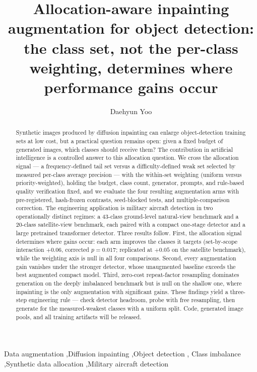 \documentclass[preprint,12pt,authoryear]{elsarticle}
\begin{document}
\begin{frontmatter}

\title{Allocation-aware inpainting augmentation for object detection:
the class set, not the per-class weighting, determines where
performance gains occur}

\author[a]{Daehyun Yoo}

\begin{abstract}
Synthetic images produced by diffusion inpainting can enlarge
object-detection training sets at low cost, but a practical question
remains open: given a fixed budget of generated images, which classes
should receive them? The contribution in artificial intelligence is a
controlled answer to this allocation question. We cross the allocation
signal --- a frequency-defined tail set versus a difficulty-defined weak
set selected by measured per-class average precision --- with the
within-set weighting (uniform versus priority-weighted), holding the
budget, class count, generator, prompts, and rule-based quality
verification fixed, and we evaluate the four resulting augmentation arms
with pre-registered, hash-frozen contrasts, seed-blocked tests, and
multiple-comparison correction. The engineering application is military
aircraft detection in two operationally distinct regimes: a 43-class
ground-level natural-view benchmark and a 20-class satellite-view
benchmark, each paired with a compact one-stage detector and a large
pretrained transformer detector. Three results follow. First, the
allocation signal determines where gains occur: each arm improves the
classes it targets (set-by-scope interaction $+0.06$, corrected
$p = 0.017$; replicated at $+0.05$ on the satellite benchmark), while
the weighting axis is null in all four comparisons. Second, every
augmentation gain vanishes under the stronger detector, whose
unaugmented baseline exceeds the best augmented compact model. Third,
zero-cost repeat-factor resampling dominates generation on the deeply
imbalanced benchmark but is null on the shallow one, where inpainting is
the only augmentation with significant gains. These findings yield a
three-step engineering rule --- check detector headroom, probe with free
resampling, then generate for the measured-weakest classes with a
uniform split. Code, generated image pools, and all training artifacts
will be released.
\end{abstract}

\begin{keyword}
Data augmentation \sep Diffusion inpainting \sep Object detection \sep
Class imbalance \sep Synthetic data allocation \sep Military aircraft
detection
\end{keyword}

\end{frontmatter}
\end{document}
